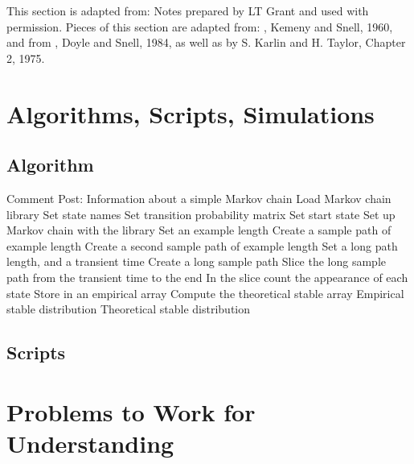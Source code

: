 \documentclass[12pt]{article}
\begin{document}
This section is adapted from:  Notes prepared by LT Grant and used with
permission.  Pieces of this section are adapted from:  , Kemeny and Snell, 1960, and from , Doyle and Snell, 1984, as well as  by S. Karlin and H. Taylor,
Chapter 2, 1975.

\hr

\section*{Algorithms, Scripts, Simulations}

\subsection*{Algorithm}

\begin{codebox}
     \zi Comment Post:  
    Information about a simple Markov chain \li Load Markov chain
    library \li Set state names \li Set transition probability matrix
    \li Set start state \li Set up Markov chain with the library \li Set
    an example length \li Create a sample path of example length \li
    Create a second sample path of example length \li Set a long path
    length, and a transient time \li Create a long sample path \li Slice
    the long sample path from the transient time to the end \li In the
    slice count the appearance of each state \li Store in an empirical
    array \li Compute the theoretical stable array \li \Return Empirical
    stable distribution \li \Return Theoretical stable distribution
\end{codebox}

\subsection*{Scripts}



\hr

\section*{Problems to Work for Understanding}
\renewcommand{\theexerciseseries}{}
\renewcommand{\theexercise}{\arabic{exercise}}
\end{document}
